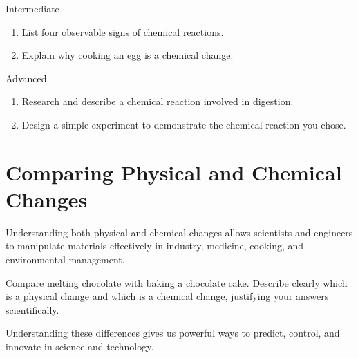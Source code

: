 \begin{tieredquestions}{Intermediate}
\begin{enumerate}
    \item List four observable signs of chemical reactions.
    \item Explain why cooking an egg is a chemical change.
\end{enumerate}
\end{tieredquestions}

\begin{tieredquestions}{Advanced}
\begin{enumerate}
    \item Research and describe a chemical reaction involved in digestion.
    \item Design a simple experiment to demonstrate the chemical reaction you chose.
\end{enumerate}
\end{tieredquestions}

\section{Comparing Physical and Chemical Changes}

Understanding both physical and chemical changes allows scientists and engineers to manipulate materials effectively in industry, medicine, cooking, and environmental management.

\begin{stopandthink}
Compare melting chocolate with baking a chocolate cake. Describe clearly which is a physical change and which is a chemical change, justifying your answers scientifically.
\end{stopandthink}

Understanding these differences gives us powerful ways to predict, control, and innovate in science and technology.